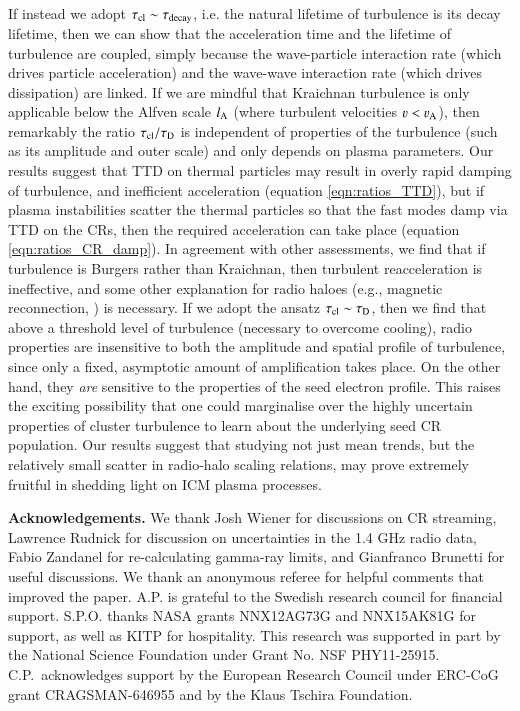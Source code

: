 \documentclass[fleqn,usenatbib,useAMS]{mnras}
\begin{document}
If instead we adopt $\tau_{\rm cl} \sim \tau_{\rm decay}$, i.e. the natural
lifetime of turbulence is its decay lifetime, then we can show that the
acceleration time and the lifetime of turbulence are coupled, simply because the
wave-particle interaction rate (which drives particle acceleration) and the
wave-wave interaction rate (which drives dissipation) are linked. If we are
mindful that Kraichnan turbulence is only applicable below the Alfven scale
$l_{\rm A}$ (where turbulent velocities $\varv < \varv_{\rm A}$), then remarkably the
ratio $\tau_{\rm cl}/\tau_{\rm D}$ is independent of properties of the
turbulence (such as its amplitude and outer scale) and only depends on plasma
parameters. Our results suggest that TTD on thermal particles may result in
overly rapid damping of turbulence, and inefficient acceleration (equation
\ref{eqn:ratios_TTD}), but if plasma instabilities scatter the thermal particles
so that the fast modes damp via TTD on the CRs, then the required
acceleration can take place (equation \ref{eqn:ratios_CR_damp}). In agreement
with other assessments, we find that if turbulence is Burgers rather than
Kraichnan, then turbulent reacceleration is ineffective, and some other
explanation for radio haloes (e.g., magnetic reconnection, \citealt{brunetti16}) is
necessary. If we adopt the ansatz $\tau_{\rm cl} \sim \tau_{\rm D}$, then we
find that above a threshold level of turbulence (necessary to overcome cooling),
radio properties are insensitive to both the amplitude and spatial profile of
turbulence, since only a fixed, asymptotic amount of amplification takes
place. On the other hand, they {\it are} sensitive to the properties of the seed
electron profile. This raises the exciting possibility that one could
marginalise over the highly uncertain properties of cluster turbulence to learn
about the underlying seed CR population. Our results suggest that studying not
just mean trends, but the relatively small scatter in radio-halo scaling
relations, may prove extremely fruitful in shedding light on ICM plasma
processes.


{\bf Acknowledgements.} We thank Josh Wiener for discussions on CR streaming,
Lawrence Rudnick for discussion on uncertainties in the 1.4 GHz radio data,
Fabio Zandanel for re-calculating gamma-ray limits, and Gianfranco Brunetti for
useful discussions. We thank an anonymous referee for helpful comments that
improved the paper. A.P. is grateful to the Swedish research council for
financial support. S.P.O. thanks NASA grants NNX12AG73G and NNX15AK81G for
support, as well as KITP for hospitality. This research was supported in part by
the National Science Foundation under Grant No. NSF
PHY11-25915. C.P.~acknowledges support by the European Research Council under
ERC-CoG grant CRAGSMAN-646955 and by the Klaus Tschira Foundation.


\vspace{-0.7cm}



\end{document}
